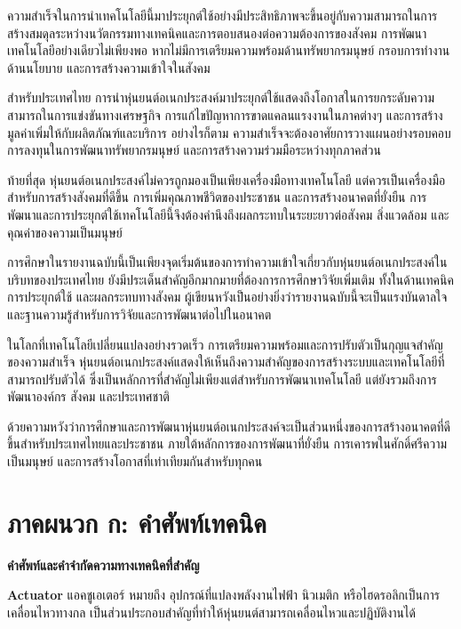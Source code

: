 \documentclass[a4paper]{article}
\begin{document}
ความสำเร็จในการนำเทคโนโลยีนี้มาประยุกต์ใช้อย่างมีประสิทธิภาพจะขึ้นอยู่กับความสามารถในการสร้างสมดุลระหว่างนวัตกรรมทางเทคนิคและการตอบสนองต่อความต้องการของสังคม การพัฒนาเทคโนโลยีอย่างเดียวไม่เพียงพอ หากไม่มีการเตรียมความพร้อมด้านทรัพยากรมนุษย์ กรอบการทำงานด้านนโยบาย และการสร้างความเข้าใจในสังคม

สำหรับประเทศไทย การนำหุ่นยนต์อเนกประสงค์มาประยุกต์ใช้แสดงถึงโอกาสในการยกระดับความสามารถในการแข่งขันทางเศรษฐกิจ การแก้ไขปัญหาการขาดแคลนแรงงานในภาคต่างๆ และการสร้างมูลค่าเพิ่มให้กับผลิตภัณฑ์และบริการ อย่างไรก็ตาม ความสำเร็จจะต้องอาศัยการวางแผนอย่างรอบคอบ การลงทุนในการพัฒนาทรัพยากรมนุษย์ และการสร้างความร่วมมือระหว่างทุกภาคส่วน

ท้ายที่สุด หุ่นยนต์อเนกประสงค์ไม่ควรถูกมองเป็นเพียงเครื่องมือทางเทคโนโลยี แต่ควรเป็นเครื่องมือสำหรับการสร้างสังคมที่ดีขึ้น การเพิ่มคุณภาพชีวิตของประชาชน และการสร้างอนาคตที่ยั่งยืน การพัฒนาและการประยุกต์ใช้เทคโนโลยีนี้จึงต้องคำนึงถึงผลกระทบในระยะยาวต่อสังคม สิ่งแวดล้อม และคุณค่าของความเป็นมนุษย์

การศึกษาในรายงานฉบับนี้เป็นเพียงจุดเริ่มต้นของการทำความเข้าใจเกี่ยวกับหุ่นยนต์อเนกประสงค์ในบริบทของประเทศไทย ยังมีประเด็นสำคัญอีกมากมายที่ต้องการการศึกษาวิจัยเพิ่มเติม ทั้งในด้านเทคนิค การประยุกต์ใช้ และผลกระทบทางสังคม ผู้เขียนหวังเป็นอย่างยิ่งว่ารายงานฉบับนี้จะเป็นแรงบันดาลใจและฐานความรู้สำหรับการวิจัยและการพัฒนาต่อไปในอนาคต

ในโลกที่เทคโนโลยีเปลี่ยนแปลงอย่างรวดเร็ว การเตรียมความพร้อมและการปรับตัวเป็นกุญแจสำคัญของความสำเร็จ หุ่นยนต์อเนกประสงค์แสดงให้เห็นถึงความสำคัญของการสร้างระบบและเทคโนโลยีที่สามารถปรับตัวได้ ซึ่งเป็นหลักการที่สำคัญไม่เพียงแต่สำหรับการพัฒนาเทคโนโลยี แต่ยังรวมถึงการพัฒนาองค์กร สังคม และประเทศชาติ

ด้วยความหวังว่าการศึกษาและการพัฒนาหุ่นยนต์อเนกประสงค์จะเป็นส่วนหนึ่งของการสร้างอนาคตที่ดีขึ้นสำหรับประเทศไทยและประชาชน ภายใต้หลักการของการพัฒนาที่ยั่งยืน การเคารพในศักดิ์ศรีความเป็นมนุษย์ และการสร้างโอกาสที่เท่าเทียมกันสำหรับทุกคน

\newpage
\printbibliography[title=บรรณานุกรม]

\newpage
\appendix

\section{ภาคผนวก ก: คำศัพท์เทคนิค}

\textbf{คำศัพท์และคำจำกัดความทางเทคนิคที่สำคัญ}

\textbf{Actuator} แอคชูเอเตอร์ หมายถึง อุปกรณ์ที่แปลงพลังงานไฟฟ้า นิวเมติก หรือไฮดรอลิกเป็นการเคลื่อนไหวทางกล เป็นส่วนประกอบสำคัญที่ทำให้หุ่นยนต์สามารถเคลื่อนไหวและปฏิบัติงานได้
\end{document}
